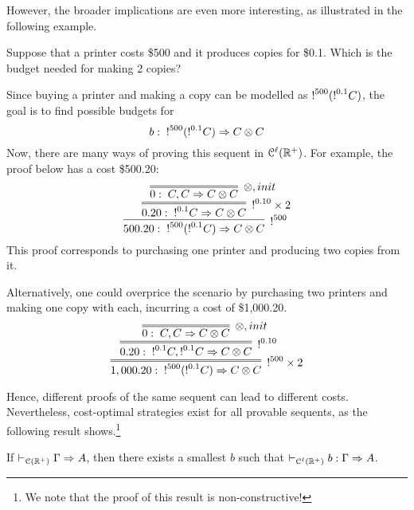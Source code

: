 %
However, the broader implications are even more interesting, as illustrated in the following example.
\begin{example}
Suppose that a printer costs \$500 and it produces copies for \$0.1. Which is the budget needed for making 2 copies?

Since buying a printer and making a copy can be modelled as  $\hbox{$\mathop{!}^{500}$}(\hbox{$\mathop{!}^{0.1}$}C)$, the goal is to find possible budgets for 
$$
b:\;  \hbox{$\mathop{!}^{500}$}(\hbox{$\mathop{!}^{0.1}$}C)\Rightarrow C\otimes C
$$
Now, there are many ways of proving this sequent in $\mathcal{C}^\ell(\mathbb{R}^+)$. For example, the proof below has a cost \$500.20:
$$
\infer[\nbang{500}]{500.20:\;  \nbang{500}(\nbang{0.1}C)\seq C\otimes C}
{\infer=[\nbang{0.10} \times 2]{0.20:\;  \nbang{0.1}C\seq C\otimes C}
{\infer=[\otimes,init]{0:\;  C,C\seq C\otimes C}{}}} 
$$
This proof corresponds to purchasing one printer and producing two copies from it.

Alternatively, one could overprice the scenario by purchasing two printers and making one copy with each, incurring a cost of \$1,000.20.
$$
\infer=[\nbang{500}  \times 2]{1,000.20:\;  \nbang{500}(\nbang{0.1}C)\seq C\otimes C}
{\infer=[\nbang{0.10}]{0.20:\;  \nbang{0.1}C,\nbang{0.1}C\seq C\otimes C}
{\infer=[\otimes,init]{0:\;  C,C\seq C\otimes C}{}}} 
$$
\end{example}
Hence, different proofs of the same sequent can lead to different costs. Nevertheless, cost-optimal strategies exist for all provable sequents, as the following result shows.\footnote{We note that the proof of this result is non-constructive!}

\begin{theorem}\label{cor:spectrum}
If $\vdash_{\mathcal{C}(\mathbb{R}^+)}\Gamma\Rightarrow A$, then there exists a smallest $b$ such that $\vdash_{\mathcal{C}^\ell(\mathbb{R}^+)}b: \Gamma\Rightarrow A$.
\end{theorem}


